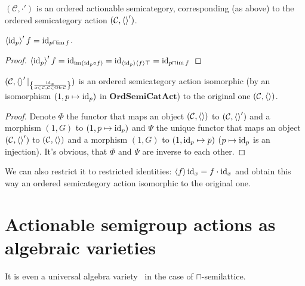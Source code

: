 \documentclass[a4paper,oneside,english,reqno]{amsart}
\begin{document}
\begin{obvious}
$(\mathcal{C},\cdot')$ is an ordered actionable semicategory, corresponding (as above) to the ordered semicategory action $(\mathcal{C},\left\langle \right\rangle')$.
\end{obvious}

\begin{prop}
$\left\langle {\operatorname{id}}_p\right\rangle'f = {\operatorname{id}}_{p\sqcap\operatorname{im} f}$.
\end{prop}

\begin{proof}
$\left\langle {\operatorname{id}}_p\right\rangle'f = {\operatorname{id}}_{\operatorname{im}({\operatorname{id}}_p\circ f)} = {\operatorname{id}}_{\left\langle {\operatorname{id}}_p\right\rangle\left\langle f\right\rangle\top} = {\operatorname{id}}_{p\sqcap\operatorname{im} f}$
\end{proof}

\begin{thm}
$(\mathcal{C},\left\langle \right\rangle'|_{\left\{ \frac{{\operatorname{id}}_x}{x\in\mathcal{C},\mathcal{C}\in\operatorname{Ob}\mathcal{C}}\right\}})$ is an ordered semicategory action isomorphic (by an isomorphism $(1,p\mapsto{\operatorname{id}}_p)$ in $\mathbf{OrdSemiCatAct}$) to the original one $(\mathcal{C},\left\langle \right\rangle)$.
\end{thm}

\begin{proof}
Denote $\Phi$ the functor that maps an object $(\mathcal{C},\left\langle \right\rangle)$ to $(\mathcal{C},\left\langle \right\rangle')$ and a morphism $(1,G)$ to $(1,p\mapsto{\operatorname{id}}_p)$ and $\Psi$ the unique functor that maps an object $(\mathcal{C},\left\langle \right\rangle')$ to $(\mathcal{C},\left\langle \right\rangle)$ and a morphism $(1,G)$ to $(1,{\operatorname{id}}_p\mapsto p)$ ($p\mapsto{\operatorname{id}}_p$ is an injection). It's obvious, that $\Phi$ and $\Psi$ are inverse to each other.
\end{proof}

We can also restrict it to restricted identities: $\left\langle f\right\rangle{\operatorname{id}}_x = f\cdot{\operatorname{id}}_x$ and obtain this way an ordered semicategory action isomorphic to the original one.

\section{Actionable semigroup actions as algebraic varieties}

\begin{rem}
It is even a universal algebra variety~\cite{varieties-props} in the case of $\sqcap$-semilattice.
\end{rem}
\end{document}
